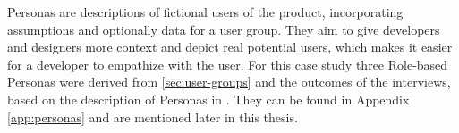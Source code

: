 Personas are descriptions of fictional users of the product, incorporating assumptions and optionally data for a user group.
They aim to give developers and designers more context and depict real potential users, which makes it easier for a developer to empathize with the user.
For this case study three Role-based Personas were derived from \ref{sec:user-groups} and the outcomes of the interviews, based on the description of Personas in \cite[pp. 403-405]{Interactiondesign:2019ys}. They can be found in Appendix \ref{app:personas} and are mentioned later in this thesis.
